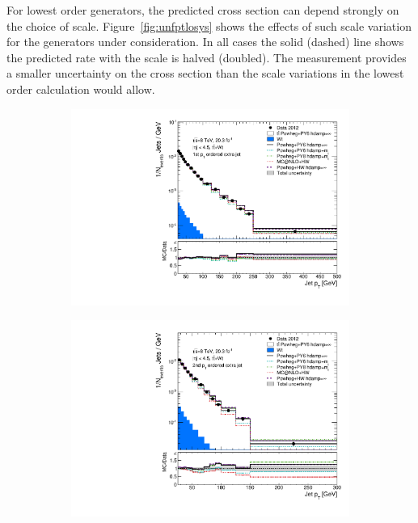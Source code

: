  For lowest order generators, the predicted cross section can depend strongly on the choice of 
scale.  Figure~\ref{fig:unfptlosys} shows the effects of such scale variation for the generators under consideration.  In all cases the solid
(dashed) line shows the predicted rate with the scale is halved (doubled).  The measurement provides a smaller uncertainty on the cross section than the 
scale variations in the lowest order calculation would allow.
\begin{figure}
\centering
\begin{subfigure}[]{0.45\textwidth}
\includegraphics[width=\textwidth]{fig/DataUnfold/NLO/PtJet0.pdf}
\end{subfigure}
\begin{subfigure}[]{0.45\textwidth}
\includegraphics[width=\textwidth]{fig/DataUnfold/NLO/PtJet1.pdf}

\end{subfigure}
\end{figure}
